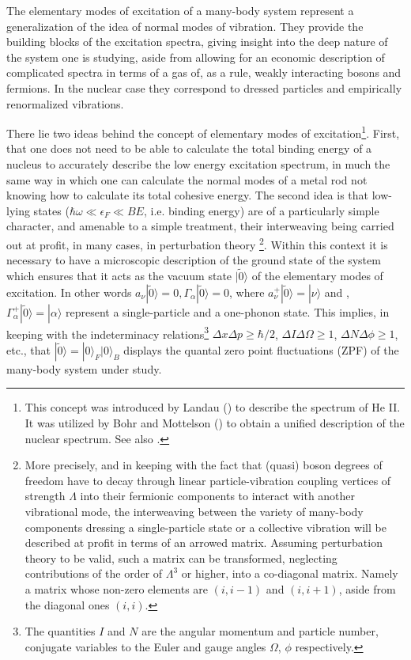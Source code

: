 The elementary modes of excitation  of a many-body system  represent a generalization of  the idea of normal modes of vibration.
They provide the building blocks of the excitation spectra, giving  insight  into the  deep nature  of the system one is studying, aside from allowing 
for an economic description  of complicated spectra in terms of a gas of, as a rule, weakly interacting bosons and fermions. In the nuclear case 
they correspond to dressed particles and empirically renormalized vibrations.

There lie two ideas behind the concept of elementary modes of excitation\footnote{This concept was introduced by Landau (\cite{Landau:41}) to describe the spectrum of He II. It was  utilized by Bohr and Mottelson (\cite{Bohr:75}) to obtain a unified description of the nuclear spectrum. See also \cite{terHaar:65,terHaar:69}.}. First, that one does not need to be able to calculate the total binding
energy  of a nucleus to accurately describe the low energy excitation spectrum, in much the same way in which one can calculate 
the normal modes of a metal rod not knowing how to  calculate its total cohesive energy.
The second idea is that low-lying states ($\hbar \omega \ll \epsilon_F \ll BE$, i.e. binding energy) are of a particularly simple
character, and  amenable to a simple treatment, their
interweaving  being carried out at profit, in many cases,  in perturbation theory
\footnote{More precisely, and in keeping with  the fact that (quasi)
boson degrees of freedom have to decay through linear particle-vibration 
coupling vertices of strength $\Lambda$ into their fermionic components to interact with another vibrational mode,
the interweaving between the variety of many-body components dressing a single-particle state 
or a collective vibration will be described at profit in terms of an arrowed matrix. Assuming perturbation theory
to be valid, such a matrix can be transformed, neglecting contributions of the order of $\Lambda^3$ or higher, into a co-diagonal matrix. Namely a matrix 
whose non-zero elements are $(i,i-1)$ and $(i,i+1)$,  aside from  the diagonal ones $(i,i)$.}. 
Within this context it is  necessary to have a microscopic description 
of the ground  state of the system  which ensures that it acts as the vacuum state 
$|\tilde0\rangle  $ of the elementary modes of excitation. In other words $a_{\nu}|\tilde 0 \rangle   = 0, \Gamma_{\alpha} |\tilde 0\rangle   =0$, where
$a^+_{\nu}|\tilde 0 \rangle   = |\nu\rangle  $ and , $\Gamma^+_{\alpha} |\tilde 0\rangle   =|\alpha\rangle  $ represent a single-particle and a one-phonon state.
This   implies, in keeping 
with the indeterminacy  relations\footnote{The quantities $I$ and $N$   are the angular momentum and particle number, conjugate variables to the Euler and gauge angles $\Omega$, $\phi$ respectively.} $\Delta x \Delta p \geq \hbar/2$, $\Delta I \Delta \Omega \geq 1$, $\Delta N \Delta \phi \geq 1$, etc.,  that $|\tilde 0\rangle   = |0\rangle  _F |0\rangle  _B$
displays the  quantal zero point fluctuations (ZPF) of the many-body system under study.

